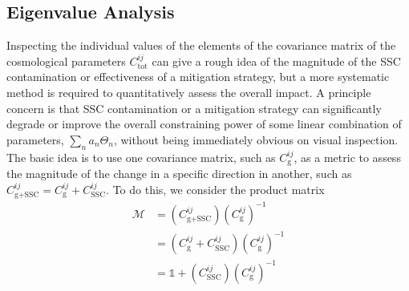\documentclass[a4paper,11pt]{article}
\begin{document}
\subsection{Eigenvalue Analysis}
\label{ssec:eig}
Inspecting the individual values of the elements of the covariance matrix of the cosmological parameters $C^{ij}_{\text{tot}}$ can give a rough idea of the magnitude of the SSC contamination or effectiveness of a mitigation strategy, but a more systematic method is required to quantitatively assess the overall impact. A principle concern is that SSC contamination or a mitigation strategy can significantly degrade or improve the overall constraining power of some linear combination of parameters, $\sum_{n}{a_n \Theta_n}$, without being immediately obvious on visual inspection. The basic idea is to use one covariance matrix, such as $C^{ij}_{\text{g}}$, as a metric to assess the magnitude of the change in a specific direction in another, such as $C^{ij}_{\text{g+SSC}}=C^{ij}_{\text{g}}+C^{ij}_{\text{SSC}}$. To do this, we consider the product matrix 
\begin{align}\label{m_tot_gauss}
\mathcal{M}&=(C^{ij}_{\text{g+SSC}})(C^{ij}_{\text{g}})^{-1}\\
&=(C^{ij}_{\text{g}}+C^{ij}_{\text{SSC}})(C^{ij}_{\text{g}})^{-1}\\
&=\mathbb{1}+(C^{ij}_{\text{SSC}})(C^{ij}_{\text{g}})^{-1}
\end{align}
\end{document}
